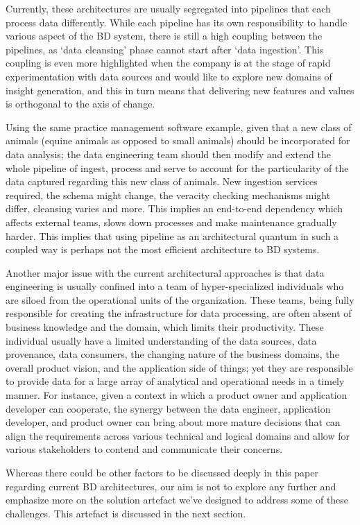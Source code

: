 \documentclass{bmcart}
\begin{document}
Currently, these architectures are usually segregated into pipelines that each process data differently. While each pipeline has its own responsibility to handle various aspect of the BD system, there is still a high coupling between the pipelines, as `data cleansing' phase cannot start after `data ingestion'. This coupling is even more highlighted when the company is at the stage of rapid experimentation with data sources and would like to explore new domains of insight generation, and this in turn means that delivering new features and values is orthogonal to the axis of change.

Using the same practice management software example, given that a new class of animals (equine animals as opposed to small animals) should be incorporated for data analysis; the data engineering team should then modify and extend the whole pipeline of ingest, process and serve to account for the particularity of the data captured regarding this new class of animals. New ingestion services required, the schema might change, the veracity checking mechanisms might differ, cleansing varies and more. This implies an end-to-end dependency which affects external teams, slows down processes and make maintenance gradually harder. This implies that using pipeline as an architectural quantum in such a coupled way is perhaps not the most efficient architecture to BD systems.

Another major issue with the current architectural approaches is that data engineering is usually confined into a team of hyper-specialized individuals who are siloed from the operational units of the organization. These teams, being fully responsible for creating the infrastructure for data processing, are often absent of business knowledge and the domain, which limits their productivity. These individual usually have a limited understanding of the data sources, data provenance, data consumers, the changing nature of the business domains, the overall product vision, and the application side of things; yet they are responsible to provide data for a large array of analytical and operational needs in a timely manner. For instance, given a context in which a product owner and application developer can cooperate, the synergy between the data engineer, application developer, and product owner can bring about more mature decisions that can align the requirements across various technical and logical domains and allow for various stakeholders to contend and communicate their concerns.

Whereas there could be other factors to be discussed deeply in this paper regarding current BD architectures, our aim is not to explore any further and emphasize more on the solution artefact we've designed to address some of these challenges. This artefact is discussed in the next section.
\end{document}
